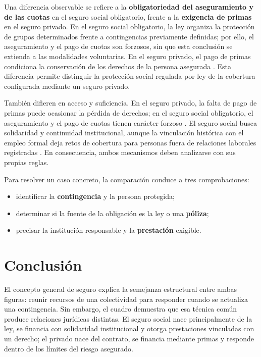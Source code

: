 \documentclass[12pt,letterpaper,oneside]{article}
\begin{document}
Una diferencia observable se refiere a la \textbf{obligatoriedad del aseguramiento y de las cuotas} en el seguro social obligatorio, frente a la \textbf{exigencia de primas} en el seguro privado. En el seguro social obligatorio, la ley organiza la protecci\'on de grupos determinados frente a contingencias previamente definidas; por ello, el aseguramiento y el pago de cuotas son forzosos, sin que esta conclusi\'on se extienda a las modalidades voluntarias. En el seguro privado, el pago de primas condiciona la conservaci\'on de los derechos de la persona asegurada \citep{bricenoRuiz2011}. Esta diferencia permite distinguir la protecci\'on social regulada por ley de la cobertura configurada mediante un seguro privado.

Tambi\'en difieren en acceso y suficiencia. En el seguro privado, la falta de pago de primas puede ocasionar la p\'erdida de derechos; en el seguro social obligatorio, el aseguramiento y el pago de cuotas tienen car\'acter forzoso \citep{bricenoRuiz2011}. El seguro social busca solidaridad y continuidad institucional, aunque la vinculaci\'on hist\'orica con el empleo formal deja retos de cobertura para personas fuera de relaciones laborales registradas \citep{perezSotoCalderon2012,idcRodriguez2019}. En consecuencia, ambos mecanismos deben analizarse con sus propias reglas.

Para resolver un caso concreto, la comparaci\'on conduce a tres comprobaciones:
\begin{itemize}
  \item identificar la \textbf{contingencia} y la persona protegida;
  \item determinar si la fuente de la obligaci\'on es la ley o una \textbf{p\'oliza};
  \item precisar la instituci\'on responsable y la \textbf{prestaci\'on} exigible.
\end{itemize}

\clearpage
\section{Conclusi\'on}

El concepto general de seguro explica la semejanza estructural entre ambas figuras: reunir recursos de una colectividad para responder cuando se actualiza una contingencia. Sin embargo, el cuadro demuestra que esa t\'ecnica com\'un produce relaciones jur\'idicas distintas. El seguro social nace principalmente de la ley, se financia con solidaridad institucional y otorga prestaciones vinculadas con un derecho; el privado nace del contrato, se financia mediante primas y responde dentro de los l\'imites del riesgo asegurado.
\end{document}
